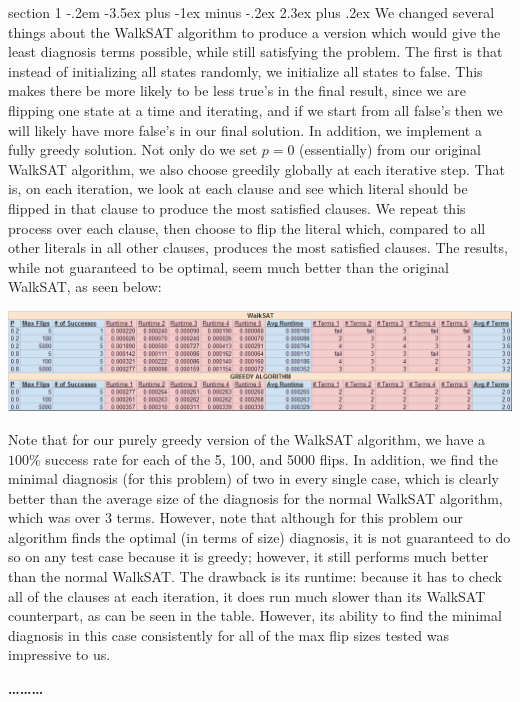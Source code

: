 \documentclass[12pt]{article}
\makeatletter
\newenvironment{problem}{\@startsection
       {section}
       {1}
       {-.2em}
       {-3.5ex plus -1ex minus -.2ex}
       {2.3ex plus .2ex}
       {\pagebreak[3] %
       \large\bf\noindent{Problem }
       }
       }
       {%
       \begin{center}\large\bf \ldots\ldots\ldots\end{center}}
\makeatother
\begin{document}
\begin{problem}{}
We changed several things about the WalkSAT algorithm to produce a version which would give the least diagnosis terms possible, while still satisfying the problem. The first is that instead of initializing all states randomly, we initialize all states to false. This makes there be more likely to be less true's in the final result, since we are flipping one state at a time and iterating, and if we start from all false's then we will likely have more false's in our final solution. In addition, we implement a fully greedy solution. Not only do we set $p = 0$ (essentially) from our original WalkSAT algorithm, we also choose greedily globally at each iterative step. That is, on each iteration, we look at each clause and see which literal should be flipped in that clause to produce the most satisfied clauses. We repeat this process over each clause, then choose to flip the literal which, compared to all other literals in all other clauses, produces the most satisfied clauses. The results, while not guaranteed to be optimal, seem much better than the original WalkSAT, as seen below:

\begin{center}
\includegraphics[width=\textwidth]{results.png}
\end{center}

Note that for our purely greedy version of the WalkSAT algorithm, we have a $100\%$ success rate for each of the 5, 100, and 5000 flips. In addition, we find the minimal diagnosis (for this problem) of two in every single case, which is clearly better than the average size of the diagnosis for the normal WalkSAT algorithm, which was over $3$ terms. However, note that although for this problem our algorithm finds the optimal (in terms of size) diagnosis, it is not guaranteed to do so on any test case because it is greedy; however, it still performs much better than the normal WalkSAT. The drawback is its runtime: because it has to check all of the clauses at each iteration, it does run much slower than its WalkSAT counterpart, as can be seen in the table. However, its ability to find the minimal diagnosis in this case consistently for all of the max flip sizes tested was impressive to us.
\end{problem}
\end{document}
